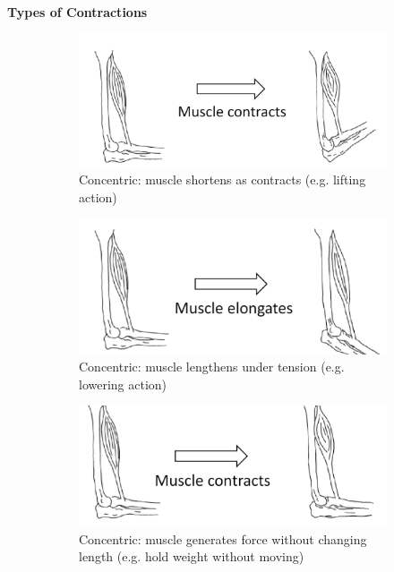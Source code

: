 \documentclass[11pt,fleqn]{book} %
\begin{document}
\textbf{Types of Contractions}
\begin{figure}[h!]
    \centering
    \begin{subfigure}{0.45\textwidth}
        \includegraphics[width=\textwidth]{Pictures/Screenshot 2024-04-03 000405.png}
        \caption{Concentric: muscle shortens
as contracts (e.g. lifting
action)}
    \end{subfigure}
    \hfill
    \begin{subfigure}{0.45\textwidth}
        \includegraphics[width=\textwidth]{Pictures/Screenshot 2024-04-03 000414.png}
        \caption{Concentric: muscle lengthens
under tension (e.g. lowering
action)}
    \end{subfigure}
    \begin{subfigure}{0.45\textwidth}
        \includegraphics[width=\textwidth]{Pictures/Screenshot 2024-04-03 000424.png}
        \caption{Concentric: muscle generates
force without changing length
(e.g. hold weight without
moving)}
    \end{subfigure}
    \caption{}
\end{figure}
\end{document}
